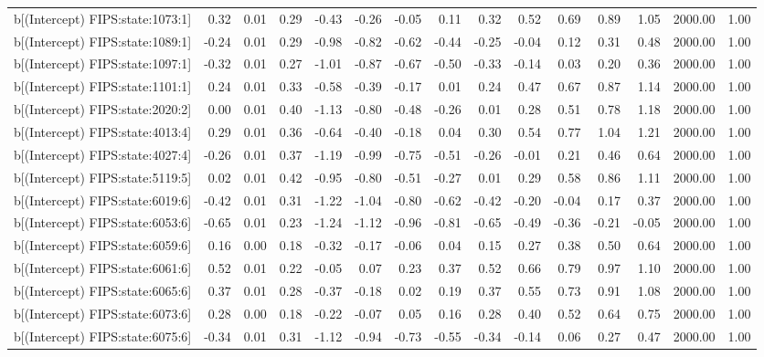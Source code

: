 \begin{table}[ht]
\begin{tabular}{rrrrrrrrrrrrrrr}
  b[(Intercept) FIPS:state:1073:1] & 0.32 & 0.01 & 0.29 & -0.43 & -0.26 & -0.05 & 0.11 & 0.32 & 0.52 & 0.69 & 0.89 & 1.05 & 2000.00 & 1.00 \\ 
  b[(Intercept) FIPS:state:1089:1] & -0.24 & 0.01 & 0.29 & -0.98 & -0.82 & -0.62 & -0.44 & -0.25 & -0.04 & 0.12 & 0.31 & 0.48 & 2000.00 & 1.00 \\ 
  b[(Intercept) FIPS:state:1097:1] & -0.32 & 0.01 & 0.27 & -1.01 & -0.87 & -0.67 & -0.50 & -0.33 & -0.14 & 0.03 & 0.20 & 0.36 & 2000.00 & 1.00 \\ 
  b[(Intercept) FIPS:state:1101:1] & 0.24 & 0.01 & 0.33 & -0.58 & -0.39 & -0.17 & 0.01 & 0.24 & 0.47 & 0.67 & 0.87 & 1.14 & 2000.00 & 1.00 \\ 
  b[(Intercept) FIPS:state:2020:2] & 0.00 & 0.01 & 0.40 & -1.13 & -0.80 & -0.48 & -0.26 & 0.01 & 0.28 & 0.51 & 0.78 & 1.18 & 2000.00 & 1.00 \\ 
  b[(Intercept) FIPS:state:4013:4] & 0.29 & 0.01 & 0.36 & -0.64 & -0.40 & -0.18 & 0.04 & 0.30 & 0.54 & 0.77 & 1.04 & 1.21 & 2000.00 & 1.00 \\ 
  b[(Intercept) FIPS:state:4027:4] & -0.26 & 0.01 & 0.37 & -1.19 & -0.99 & -0.75 & -0.51 & -0.26 & -0.01 & 0.21 & 0.46 & 0.64 & 2000.00 & 1.00 \\ 
  b[(Intercept) FIPS:state:5119:5] & 0.02 & 0.01 & 0.42 & -0.95 & -0.80 & -0.51 & -0.27 & 0.01 & 0.29 & 0.58 & 0.86 & 1.11 & 2000.00 & 1.00 \\ 
  b[(Intercept) FIPS:state:6019:6] & -0.42 & 0.01 & 0.31 & -1.22 & -1.04 & -0.80 & -0.62 & -0.42 & -0.20 & -0.04 & 0.17 & 0.37 & 2000.00 & 1.00 \\ 
  b[(Intercept) FIPS:state:6053:6] & -0.65 & 0.01 & 0.23 & -1.24 & -1.12 & -0.96 & -0.81 & -0.65 & -0.49 & -0.36 & -0.21 & -0.05 & 2000.00 & 1.00 \\ 
  b[(Intercept) FIPS:state:6059:6] & 0.16 & 0.00 & 0.18 & -0.32 & -0.17 & -0.06 & 0.04 & 0.15 & 0.27 & 0.38 & 0.50 & 0.64 & 2000.00 & 1.00 \\ 
  b[(Intercept) FIPS:state:6061:6] & 0.52 & 0.01 & 0.22 & -0.05 & 0.07 & 0.23 & 0.37 & 0.52 & 0.66 & 0.79 & 0.97 & 1.10 & 2000.00 & 1.00 \\ 
  b[(Intercept) FIPS:state:6065:6] & 0.37 & 0.01 & 0.28 & -0.37 & -0.18 & 0.02 & 0.19 & 0.37 & 0.55 & 0.73 & 0.91 & 1.08 & 2000.00 & 1.00 \\ 
  b[(Intercept) FIPS:state:6073:6] & 0.28 & 0.00 & 0.18 & -0.22 & -0.07 & 0.05 & 0.16 & 0.28 & 0.40 & 0.52 & 0.64 & 0.75 & 2000.00 & 1.00 \\ 
  b[(Intercept) FIPS:state:6075:6] & -0.34 & 0.01 & 0.31 & -1.12 & -0.94 & -0.73 & -0.55 & -0.34 & -0.14 & 0.06 & 0.27 & 0.47 & 2000.00 & 1.00 \\ 

\end{tabular}
\end{table}
